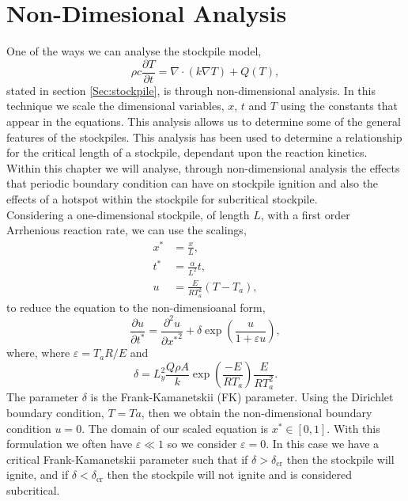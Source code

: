 \chapter{Non-Dimesional Analysis}
One of the ways we can analyse the stockpile model,
\begin{equation}
\rho c \frac{\partial T}{\partial t}=\nabla \cdot \left(k\nabla T\right) +Q(T), \label{base2}
\end{equation}
stated in section \ref{Sec:stockpile}, is through non-dimensional analysis. In this technique we scale the dimensional variables, $x$, $t$ and $T$ using the constants that appear in the equations. This analysis allows us to determine some of the general features of the stockpiles. This analysis has been used to determine a relationship for the critical length of a stockpile, dependant upon the reaction kinetics. Within this chapter we will analyse, through non-dimensional analysis the effects that periodic boundary condition can have on stockpile ignition and also the effects of a hotspot within the stockpile for subcritical stockpile.\\

Considering a one-dimensional stockpile, of length $L$, with a first order Arrhenious reaction rate, we can use the scalings,
\begin{align*}
x^*&=\frac{x}{L},\\
t^*&= \frac{\alpha}{L^2}t, \\
u&=\frac{E}{RT_a^2}\left(T-T_a\right),
\end{align*} 
to reduce the equation to the non-dimensioanal form,
\begin{equation}
\frac{\partial u}{\partial t^*}=\frac{\partial^2 u}{\partial {x^*}^2}+\delta\exp\left(\frac{u}{1+\varepsilon u}\right), \label{eq:non-dim}
\end{equation}
where,
where $\varepsilon=T_a R/E$ and $$\delta=L_y^2\frac{Q\rho A}{k}\exp\left(\frac{-E}{RT_a}\right)\frac{E}{R T_a^2}.$$ The parameter $\delta$ is the Frank-Kamanetskii (FK) parameter. Using the Dirichlet boundary condition, $T=Ta$, then we obtain the non-dimensional boundary condition $u=0$. The domain of our scaled equation is $x^*\in [0,1]$. With this formulation we often have $\varepsilon \ll 1$ so we consider $\varepsilon=0$. In this case we have a critical Frank-Kamanetskii parameter such that if $\delta>\delta_{\text{cr}}$ then the stockpile will ignite, and if $\delta<\delta_{\text{cr}} $ then the stockpile will not ignite and is considered subcritical.\\

